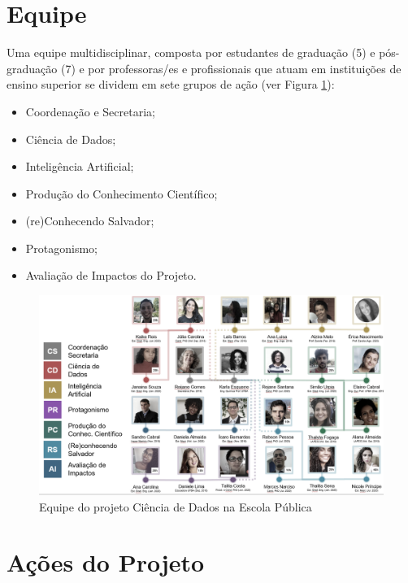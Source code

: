 \documentclass[
]{book}
\providecommand{\tightlist}{%
  \setlength{\itemsep}{0pt}\setlength{\parskip}{0pt}}
\begin{document}
\hypertarget{equipe}{%
\section*{Equipe}\label{equipe}}

Uma equipe multidisciplinar, composta por estudantes de graduação (5) e pós-graduação (7) e por professoras/es e profissionais que atuam em instituições de ensino superior se dividem em sete grupos de ação (ver Figura \ref{fig:profcdnaep}):

\begin{itemize}
\tightlist
\item
  Coordenação e Secretaria;
\item
  Ciência de Dados;
\item
  Inteligência Artificial;
\item
  Produção do Conhecimento Científico;
\item
  (re)Conhecendo Salvador;
\item
  Protagonismo;
\item
  Avaliação de Impactos do Projeto.
\end{itemize}

\begin{figure}
\includegraphics[width=17.86in]{images/image113} \caption{Equipe do projeto Ciência de Dados na Escola Pública}\label{fig:profcdnaep}
\end{figure}

\hypertarget{auxe7uxf5es-do-projeto}{%
\section*{Ações do Projeto}\label{auxe7uxf5es-do-projeto}}
\end{document}
